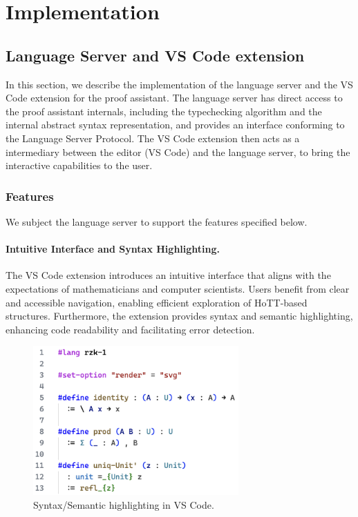 \chapter{Implementation}
\label{chap:impl}

\section{\Rzk{} Language Server and VS Code extension}

In this section, we describe the implementation of the language server
and the VS Code extension for the \Rzk{} proof assistant.
The language server has direct access to the proof assistant internals,
including the typechecking algorithm and the internal abstract syntax representation,
and provides an interface conforming to the Language Server Protocol.
The VS Code extension then acts as a intermediary between the editor (VS Code)
and the language server, to bring the interactive capabilities to the user.

\subsection{Features}


We subject the language server to support the features specified below.

\subsubsection{Intuitive Interface and Syntax Highlighting.}

The VS Code extension introduces an intuitive interface that aligns with
the expectations of mathematicians and computer scientists.
Users benefit from clear and accessible navigation,
enabling efficient exploration of HoTT-based structures.
Furthermore, the extension provides syntax and semantic highlighting,
enhancing code readability and facilitating error detection.

\begin{figure}
  \centering
  \includegraphics[width=0.7\textwidth]{figs/syntax-highlighting.png}
  \caption{Syntax/Semantic highlighting in VS Code.}
  \label{figure:syntax-highlighting}
\end{figure}

